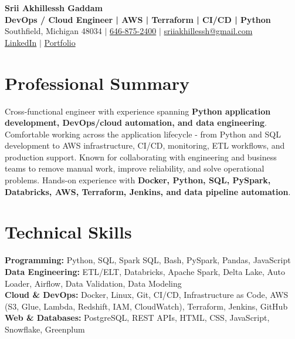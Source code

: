 \documentclass[letterpaper,10pt]{article}
\begin{document}
\fontsize{9.35pt}{10.45pt}\selectfont

\begin{center}
    {\LARGE \textbf{Srii Akhillessh Gaddam}} \\[-1pt]
    \textbf{DevOps / Cloud Engineer | AWS | Terraform | CI/CD | Python} \\[2pt]
    Southfield, Michigan 48034 $|$
    \href{tel:6468752400}{646-875-2400} $|$
    \href{mailto:sriiakhillessh@gmail.com}{sriiakhillessh@gmail.com} \\[1pt]
    \href{https://www.linkedin.com/in/srii-akhiilessh-gaddam-b48668191/}{LinkedIn} $|$
    \href{https://sriiakhillesshg.github.io/portfolio/}{Portfolio}
\end{center}
\vspace{-8pt}

\section{Professional Summary}
\small{Cross-functional engineer with experience spanning \textbf{Python application development, DevOps/cloud automation, and data engineering}. Comfortable working across the application lifecycle - from Python and SQL development to AWS infrastructure, CI/CD, monitoring, ETL workflows, and production support. Known for collaborating with engineering and business teams to remove manual work, improve reliability, and solve operational problems. Hands-on experience with \textbf{Docker, Python, SQL, PySpark, Databricks, AWS, Terraform, Jenkins, and data pipeline automation}.}

\section{Technical Skills}
\small{
\textbf{Programming:} Python, SQL, Spark SQL, Bash, PySpark, Pandas, JavaScript \\
\textbf{Data Engineering:} ETL/ELT, Databricks, Apache Spark, Delta Lake, Auto Loader, Airflow, Data Validation, Data Modeling \\
\textbf{Cloud \& DevOps:} Docker, Linux, Git, CI/CD, Infrastructure as Code, AWS (S3, Glue, Lambda, Redshift, IAM, CloudWatch), Terraform, Jenkins, GitHub \\
\textbf{Web \& Databases:} PostgreSQL, REST APIs, HTML, CSS, JavaScript, Snowflake, Greenplum
}
\end{document}
